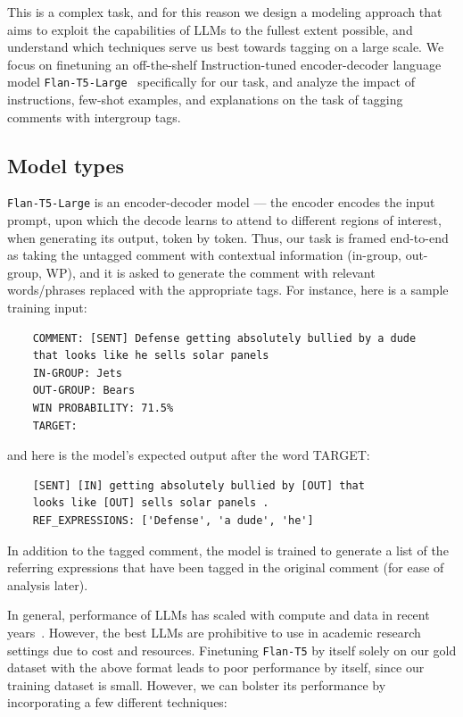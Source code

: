 This is a complex task, and for this reason we design a modeling approach that aims to exploit the capabilities of LLMs to the fullest extent possible, and understand which techniques serve us best towards tagging on a large scale. We focus on finetuning an off-the-shelf Instruction-tuned encoder-decoder language model \texttt{Flan-T5-Large}~\citep{Chung2022ScalingIL} specifically for our task, and analyze the impact of instructions, few-shot examples, and explanations on the task of tagging comments with intergroup tags.

\subsection{Model types}

\texttt{Flan-T5-Large} is an encoder-decoder model --- the encoder encodes the input prompt, upon which the decode learns to attend to different regions of interest, when generating its output, token by token. Thus, our task is framed end-to-end as taking the untagged comment with contextual information (in-group, out-group, WP), and it is asked to generate the comment with relevant words/phrases replaced with the appropriate tags. For instance, here is a sample training input:

\begin{verbatim}
    COMMENT: [SENT] Defense getting absolutely bullied by a dude
    that looks like he sells solar panels
    IN-GROUP: Jets
    OUT-GROUP: Bears
    WIN PROBABILITY: 71.5%
    TARGET:
\end{verbatim}

and here is the model's expected output after the word TARGET:

\begin{verbatim}
    [SENT] [IN] getting absolutely bullied by [OUT] that
    looks like [OUT] sells solar panels .
    REF_EXPRESSIONS: ['Defense', 'a dude', 'he']
\end{verbatim}

In addition to the tagged comment, the model is trained to generate a list of the referring expressions that have been tagged in the original comment (for ease of analysis later).

In general, performance of LLMs has scaled with compute and data in recent years~\citep{kaplan2020scaling}. However, the best LLMs are prohibitive to use in academic research settings due to cost and resources. Finetuning \texttt{Flan-T5} by itself solely on our gold dataset with the above format leads to poor performance by itself, since our training dataset is small. However, we can bolster its performance by incorporating a few different techniques: 

